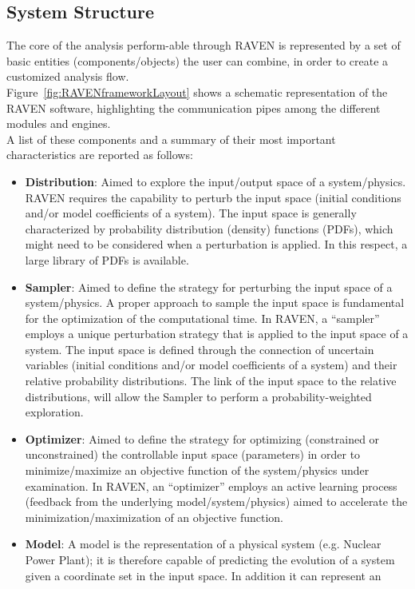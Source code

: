 \subsection{System Structure}
The core of the analysis perform-able through RAVEN is represented by a set of basic entities (components/objects) the 
user can combine, in order to create a customized analysis flow. 
\\ Figure~\ref{fig:RAVENframeworkLayout} shows a schematic representation of the RAVEN software, highlighting the communication pipes among the different modules and engines. 
\\A list of these components and a summary of their most 
important characteristics are reported as follows:
\begin{itemize}
\item	\textbf{Distribution}: Aimed to explore the input/output space of a system/physics. RAVEN requires the capability to 
perturb the input space (initial conditions and/or model coefficients of a system). The input space is generally characterized 
by probability distribution (density) functions (PDFs), which might need to be considered when a perturbation is applied. In 
this respect, a large library of PDFs is available.
\item 	\textbf{Sampler}: Aimed to define the strategy for perturbing the input space of a system/physics. A proper approach 
to sample the input space is fundamental for the optimization of the computational time. In RAVEN, a ``sampler'' employs a 
unique perturbation strategy that is applied to the input space of a system. The input space is defined through the 
connection of uncertain variables (initial conditions and/or model coefficients of a system) and their relative probability 
distributions. The link of the input space to the relative distributions, will allow the Sampler to perform a probability-weighted 
exploration.
\item 	\textbf{Optimizer}: Aimed to define the strategy for optimizing (constrained or unconstrained) the controllable input 
space (parameters) in order to 
minimize/maximize an objective function of the system/physics under examination.  In RAVEN, an ``optimizer'' employs an 
active learning process (feedback from the underlying model/system/physics) aimed to accelerate the 
minimization/maximization of an objective function.
\item 	\textbf{Model}: A model is the representation of a physical system (e.g. Nuclear Power Plant); it is therefore capable 
of predicting the evolution of a system given a coordinate set in the input space. In addition it can represent an

\end{itemize}
